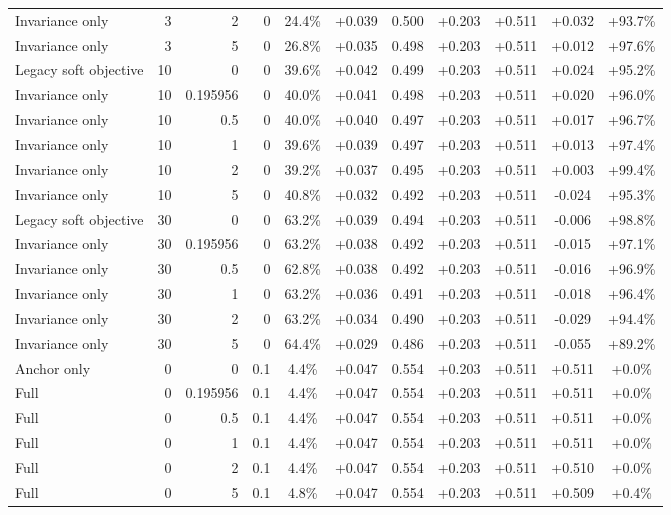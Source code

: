 \begin{table}[htbp]
\begin{tabular}{lrrrccccccc}
Invariance only & 3 & 2 & 0 & 24.4\% & +0.039 & 0.500 & +0.203 & +0.511 & +0.032 & +93.7\% \\
Invariance only & 3 & 5 & 0 & 26.8\% & +0.035 & 0.498 & +0.203 & +0.511 & +0.012 & +97.6\% \\
Legacy soft objective & 10 & 0 & 0 & 39.6\% & +0.042 & 0.499 & +0.203 & +0.511 & +0.024 & +95.2\% \\
Invariance only & 10 & 0.195956 & 0 & 40.0\% & +0.041 & 0.498 & +0.203 & +0.511 & +0.020 & +96.0\% \\
Invariance only & 10 & 0.5 & 0 & 40.0\% & +0.040 & 0.497 & +0.203 & +0.511 & +0.017 & +96.7\% \\
Invariance only & 10 & 1 & 0 & 39.6\% & +0.039 & 0.497 & +0.203 & +0.511 & +0.013 & +97.4\% \\
Invariance only & 10 & 2 & 0 & 39.2\% & +0.037 & 0.495 & +0.203 & +0.511 & +0.003 & +99.4\% \\
Invariance only & 10 & 5 & 0 & 40.8\% & +0.032 & 0.492 & +0.203 & +0.511 & -0.024 & +95.3\% \\
Legacy soft objective & 30 & 0 & 0 & 63.2\% & +0.039 & 0.494 & +0.203 & +0.511 & -0.006 & +98.8\% \\
Invariance only & 30 & 0.195956 & 0 & 63.2\% & +0.038 & 0.492 & +0.203 & +0.511 & -0.015 & +97.1\% \\
Invariance only & 30 & 0.5 & 0 & 62.8\% & +0.038 & 0.492 & +0.203 & +0.511 & -0.016 & +96.9\% \\
Invariance only & 30 & 1 & 0 & 63.2\% & +0.036 & 0.491 & +0.203 & +0.511 & -0.018 & +96.4\% \\
Invariance only & 30 & 2 & 0 & 63.2\% & +0.034 & 0.490 & +0.203 & +0.511 & -0.029 & +94.4\% \\
Invariance only & 30 & 5 & 0 & 64.4\% & +0.029 & 0.486 & +0.203 & +0.511 & -0.055 & +89.2\% \\
Anchor only & 0 & 0 & 0.1 & 4.4\% & +0.047 & 0.554 & +0.203 & +0.511 & +0.511 & +0.0\% \\
Full & 0 & 0.195956 & 0.1 & 4.4\% & +0.047 & 0.554 & +0.203 & +0.511 & +0.511 & +0.0\% \\
Full & 0 & 0.5 & 0.1 & 4.4\% & +0.047 & 0.554 & +0.203 & +0.511 & +0.511 & +0.0\% \\
Full & 0 & 1 & 0.1 & 4.4\% & +0.047 & 0.554 & +0.203 & +0.511 & +0.511 & +0.0\% \\
Full & 0 & 2 & 0.1 & 4.4\% & +0.047 & 0.554 & +0.203 & +0.511 & +0.510 & +0.0\% \\
Full & 0 & 5 & 0.1 & 4.8\% & +0.047 & 0.554 & +0.203 & +0.511 & +0.509 & +0.4\% \\

\end{tabular}
\end{table}
